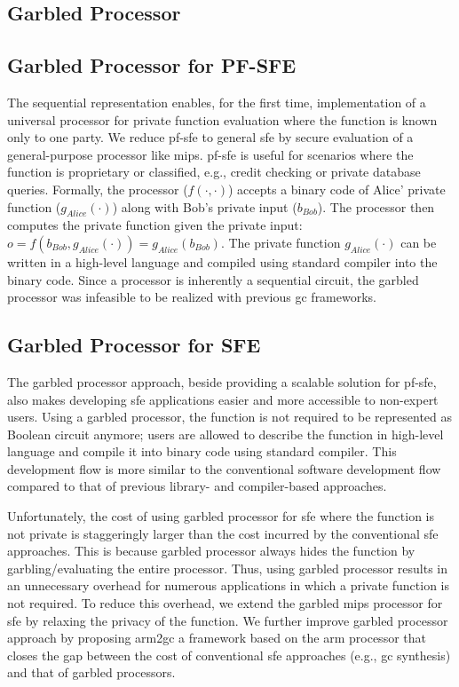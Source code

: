 \subsection{Garbled Processor}
\subsection{Garbled Processor for PF-SFE}
The sequential representation enables, for the first time, implementation of a universal processor for private function evaluation where the function is known only to one party.
We reduce \acrfull{pf-sfe} to general \acrshort{sfe} by secure evaluation of a general-purpose processor like \gls{mips}.
\acrshort{pf-sfe} is useful for scenarios where the function is proprietary or classified, e.g., credit checking or private database queries.
Formally, the processor ($f(\cdot,\cdot)$) accepts a binary code of Alice' private function ($g_{Alice}(\cdot)$) along with Bob's private input ($b_{Bob}$).
The processor then computes the private function given the private input: $o = f(b_{Bob}, g_{Alice}(\cdot)) = g_{Alice}(b_{Bob})$.
The private function $g_{Alice}(\cdot)$ can be written in a high-level language and compiled using standard compiler into the binary code.
Since a processor is inherently a sequential circuit, the garbled processor was infeasible to be realized with previous \acrshort{gc} frameworks.

\subsection{Garbled Processor for SFE}
The garbled processor approach, beside providing a scalable solution for \acrshort{pf-sfe}, also makes developing \acrshort{sfe} applications easier and more accessible to non-expert users.
Using a garbled processor, the function is not required to be represented as Boolean circuit anymore; users are allowed to describe the function in high-level language and compile it into binary code using standard compiler.
This development flow is more similar to the conventional software development flow compared to that of previous library- and compiler-based approaches.

Unfortunately, the cost of using garbled processor for \acrshort{sfe} where the function is not private is staggeringly larger than the cost incurred by the conventional \acrshort{sfe} approaches.
This is because garbled processor always hides the function by garbling/evaluating the entire processor.
Thus, using garbled processor results in an unnecessary overhead for numerous applications in which a private function is not required.
To reduce this overhead, we extend the garbled \gls{mips} processor for \acrshort{sfe} by relaxing the privacy of the function.
We further improve garbled processor approach by proposing \gls{arm2gc} a framework based on the \gls{arm} processor that closes the gap between the cost of conventional \acrshort{sfe} approaches (e.g., \acrshort{gc} synthesis) and that of garbled processors.

